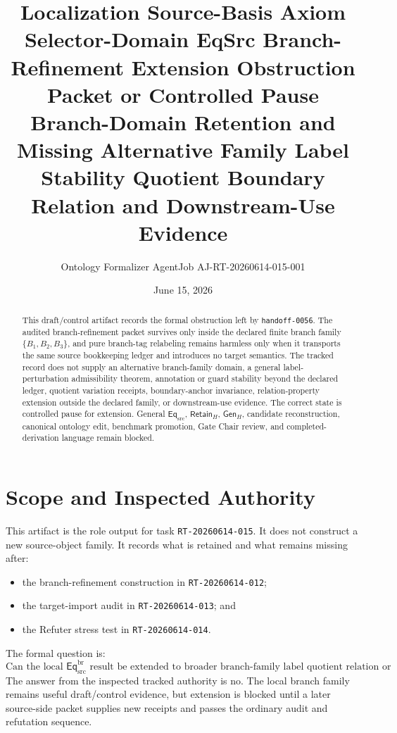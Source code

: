 \documentclass[11pt]{article}
\title{\textbf{Localization Source-Basis Axiom Selector-Domain EqSrc Branch-Refinement Extension Obstruction Packet or Controlled Pause}\\[0.35em]
\large Branch-Domain Retention and Missing Alternative Family Label Stability Quotient Boundary Relation and Downstream-Use Evidence}
\author{Ontology Formalizer AgentJob AJ-RT-20260614-015-001}
\date{June 15, 2026}
\newcommand{\EqSrc}{\mathsf{Eq}_{\mathrm{src}}}
\newcommand{\EqBr}{\mathsf{Eq}_{\mathrm{src}}^{\mathrm{br}}}
\newcommand{\RetainH}{\mathsf{Retain}_{H}}
\newcommand{\GenH}{\mathsf{Gen}_{H}}
\begin{document}
\maketitle

\begin{abstract}
This draft/control artifact records the formal obstruction left by
\texttt{handoff-0056}. The audited branch-refinement packet survives only
inside the declared finite branch family \(\{B_{1},B_{2},B_{3}\}\), and
pure branch-tag relabeling remains harmless only when it transports the
same source bookkeeping ledger and introduces no target semantics. The
tracked record does not supply an alternative branch-family domain, a
general label-perturbation admissibility theorem, annotation or guard
stability beyond the declared ledger, quotient variation receipts,
boundary-anchor invariance, relation-property extension outside the
declared family, or downstream-use evidence. The correct state is
controlled pause for extension. General \(\EqSrc\), \(\RetainH\),
\(\GenH\), candidate reconstruction, canonical ontology edit, benchmark
promotion, Gate Chair review, and completed-derivation language remain
blocked.
\end{abstract}

\section{Scope and Inspected Authority}

This artifact is the role output for task \texttt{RT-20260614-015}. It
does not construct a new source-object family. It records what is
retained and what remains missing after:
\begin{itemize}
    \item the branch-refinement construction in \texttt{RT-20260614-012};
    \item the target-import audit in \texttt{RT-20260614-013}; and
    \item the Refuter stress test in \texttt{RT-20260614-014}.
\end{itemize}

The formal question is:
\[
    \text{Can the local }\EqBr\text{ result be extended to broader
    branch-family label quotient relation or downstream use?}
\]
The answer from the inspected tracked authority is no. The local branch
family remains useful draft/control evidence, but extension is blocked
until a later source-side packet supplies new receipts and passes the
ordinary audit and refutation sequence.
\end{document}

